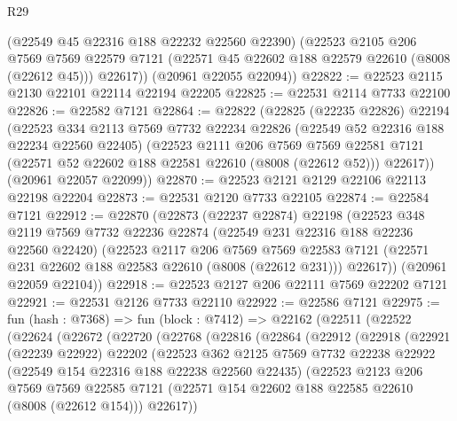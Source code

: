 \begin{lexlean}{R29}
\begin{coremodule}
        (@22549 @45 @22316 @188 @22232 @22560 @22390)
        (@22523
          @2105
          @206
          @7569
          @7569
          @22579
          @7121
          (@22571 @45 @22602 @188 @22579 @22610 (@8008 (@22612 @45)))
          @22617))
      (@20961 @22055 @22094))
@22822 := @22523 @2115 @2130 @22101 @22114 @22194 @22205
@22825 := @22531 @2114 @7733 @22100
@22826 := @22582 @7121
@22864 := @22822
    (@22825
      (@22235 @22826)
      @22194
      (@22523
        @334
        @2113
        @7569
        @7732
        @22234
        @22826
        (@22549 @52 @22316 @188 @22234 @22560 @22405)
        (@22523
          @2111
          @206
          @7569
          @7569
          @22581
          @7121
          (@22571 @52 @22602 @188 @22581 @22610 (@8008 (@22612 @52)))
          @22617))
      (@20961 @22057 @22099))
@22870 := @22523 @2121 @2129 @22106 @22113 @22198 @22204
@22873 := @22531 @2120 @7733 @22105
@22874 := @22584 @7121
@22912 := @22870
    (@22873
      (@22237 @22874)
      @22198
      (@22523
        @348
        @2119
        @7569
        @7732
        @22236
        @22874
        (@22549 @231 @22316 @188 @22236 @22560 @22420)
        (@22523
          @2117
          @206
          @7569
          @7569
          @22583
          @7121
          (@22571 @231 @22602 @188 @22583 @22610 (@8008 (@22612 @231)))
          @22617))
      (@20961 @22059 @22104))
@22918 := @22523 @2127 @206 @22111 @7569 @22202 @7121
@22921 := @22531 @2126 @7733 @22110
@22922 := @22586 @7121
@22975 := fun (hash : @7368) =>
  fun (block : @7412) =>
  @22162
    (@22511
      (@22522
        (@22624
          (@22672
            (@22720
              (@22768
                (@22816
                  (@22864
                    (@22912
                      (@22918
                        (@22921
                          (@22239 @22922)
                          @22202
                          (@22523
                            @362
                            @2125
                            @7569
                            @7732
                            @22238
                            @22922
                            (@22549 @154 @22316 @188 @22238 @22560 @22435)
                            (@22523
                              @2123
                              @206
                              @7569
                              @7569
                              @22585
                              @7121
                              (@22571 @154 @22602 @188 @22585 @22610 (@8008 (@22612 @154)))
                              @22617))

\end{coremodule}
\end{lexlean}
